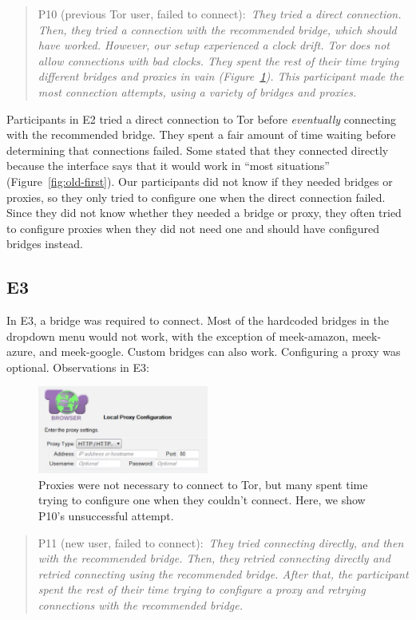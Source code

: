 \documentclass[USenglish,oneside,twocolumn]{article}
\newcommand{\pquote}[2]{
\begin{quotation}
\noindent #1:~\textit{#2}
\end{quotation}
}
\begin{document}
\pquote{P10 (previous Tor user, failed to connect)}{They tried a direct connection. Then, they tried a connection with the recommended bridge, which should have worked. However, our setup experienced a clock drift. Tor does not allow connections with bad clocks. They spent the rest of their time trying different bridges and proxies in vain (Figure~\ref{fig:proxy-attempt}). This participant made the most connection attempts, using a variety of bridges and proxies.}

Participants in E2 tried a direct connection to Tor before \emph{eventually} connecting with the recommended bridge.
They spent a fair amount of time waiting before determining that connections failed. Some stated that they connected directly because the interface says that it would work in ``most situations'' (Figure~\ref{fig:old-first}). Our participants did not know if they needed bridges or proxies, so they only tried to configure one when the direct connection failed. Since they did not know whether they needed a bridge or proxy, they often tried to configure proxies when they did not need one and should have configured bridges instead.  

\subsection{E3}
In E3, a bridge was required to connect. Most of the hardcoded bridges in the dropdown menu would not work, with the exception of meek-amazon, meek-azure, and meek-google. Custom bridges can also work. Configuring a proxy was optional.
Observations in E3: 

\begin{figure}[t]
\centering
\includegraphics[width=0.5\textwidth]{P8-proxy-attempt.png}
\caption{
Proxies were not necessary to connect to Tor, but many spent time trying to configure one when they couldn't connect. Here, we show P10's unsuccessful attempt. 
}
\label{fig:proxy-attempt}
\end{figure}

\pquote{P11 (new user, failed to connect)}{They tried connecting directly, and then with the recommended bridge. Then, they retried connecting directly and retried connecting using the recommended bridge. After that, the participant spent the rest of their time trying to configure a proxy and retrying connections with the recommended bridge.}
\end{document}
